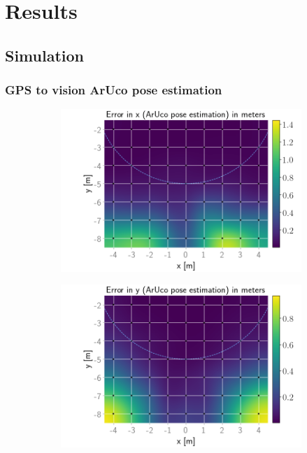 \documentclass[../Head/report.tex]{subfiles}
\begin{document}
\section{Results}
\label{sec:results}

\subsection{Simulation}

\subsubsection{GPS to vision ArUco pose estimation}

\begin{figure}[H]
    \centering
    \begin{subfigure}[t]{.337\textwidth}
        \centering
        \includegraphics[width=\textwidth]{../Figures/GPS2Vision_pose_estimation_test/test1_aruco_board_width_0.2_space_0.1/aruco_pose_estimation_error_x.png}
        \caption{}
        \label{fig:GPS2Vision_pose_estimation_test1_error_x}
    \end{subfigure}
    \hspace{-0.9em}
    \begin{subfigure}[t]{.337\textwidth}
        \centering
        \includegraphics[width=\textwidth]{../Figures/GPS2Vision_pose_estimation_test/test1_aruco_board_width_0.2_space_0.1/aruco_pose_estimation_error_y.png}

\end{subfigure}
\end{figure}
\end{document}
